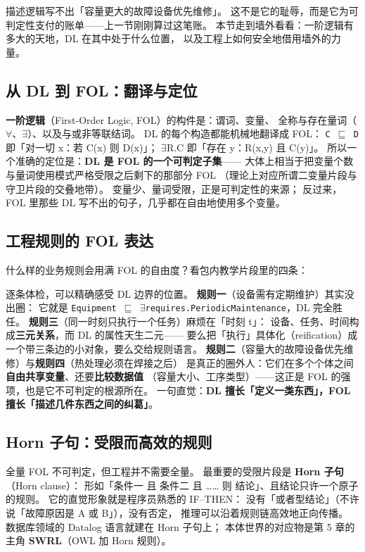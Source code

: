 描述逻辑写不出「容量更大的故障设备优先维修」。
这不是它的耻辱，而是它为可判定性支付的账单——上一节刚刚算过这笔账。
本节走到墙外看看：一阶逻辑有多大的天地，DL 在其中处于什么位置，
以及工程上如何安全地借用墙外的力量。

\subsection{从 DL 到 FOL：翻译与定位}

\textbf{一阶逻辑}（First-Order Logic, FOL）的构件是：谓词、变量、
全称与存在量词（\(\forall\)、\(\exists\)）、以及与或非等联结词。
DL 的每个构造都能机械地翻译成 FOL：
\texttt{C \(\sqsubseteq\) D} 即「对一切 x：若 C(x) 则 D(x)」；
\(\exists\)R.C 即「存在 y：R(x,y) 且 C(y)」。
所以一个准确的定位是：\textbf{DL 是 FOL 的一个可判定子集}——
大体上相当于把变量个数与量词使用模式严格受限之后剩下的那部分 FOL
（理论上对应所谓二变量片段与守卫片段的交叠地带）。
变量少、量词受限，正是可判定性的来源；
反过来，FOL 里那些 DL 写不出的句子，几乎都在自由地使用多个变量。

\subsection{工程规则的 FOL 表达}

什么样的业务规则会用满 FOL 的自由度？看包内教学片段里的四条：



逐条体检，可以精确感受 DL 边界的位置。
\textbf{规则一}（设备需有定期维护）其实没出圈：
它就是 \texttt{Equipment \(\sqsubseteq\) \(\exists\)requires.PeriodicMaintenance}，DL 完全胜任。
\textbf{规则三}（同一时刻只执行一个任务）麻烦在「时刻 t」：
设备、任务、时间构成\textbf{三元关系}，而 DL 的属性天生二元——
要么把「执行」具体化（reification）成一个带三条边的小对象，要么交给规则语言。
\textbf{规则二}（容量大的故障设备优先维修）与\textbf{规则四}（热处理必须在焊接之后）
是真正的圈外人：它们在多个个体之间\textbf{自由共享变量}、还要\textbf{比较数据值}
（容量大小、工序类型）——这正是 FOL 的强项，也是它不可判定的根源所在。
一句直觉：\textbf{DL 擅长「定义一类东西」，FOL 擅长「描述几件东西之间的纠葛」}。

\subsection{Horn 子句：受限而高效的规则}

全量 FOL 不可判定，但工程并不需要全量。
最重要的受限片段是 \textbf{Horn 子句}（Horn clause）：
形如「条件一 且 条件二 且 …… 则 结论」、且结论只许一个原子的规则。
它的直觉形象就是程序员熟悉的 IF--THEN：
没有「或者型结论」（不许说「故障原因是 A 或 B」），没有否定，
推理可以沿着规则链高效地正向传播。
数据库领域的 Datalog 语言就建在 Horn 子句上；
本体世界的对应物是第 5 章的主角 \textbf{SWRL}（OWL 加 Horn 规则）。

